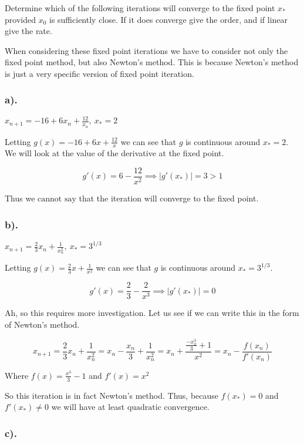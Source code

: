 \documentclass[11pt]{article}
\begin{document}
Determine which of the following iterations will converge to the fixed
point \(x_*\) provided \(x_0\) is sufficiently close. If it does
converge give the order, and if linear give the rate.

When considering these fixed point iterations we have to consider not
only the fixed point method, but also Newton's method. This is because
Newton's method is just a very specific version of fixed point
iteration.

    \hypertarget{a.}{%
\subsubsection*{a).}\label{a.}}

\(x_{n+1} = -16 + 6x_n + \frac{12}{x_n},\:x_*=2\)

    Letting \(g(x) = -16+6x+\frac{12}{x}\) we can see that \(g\) is
continuous around \(x_*=2\). We will look at the value of the derivative
at the fixed point.

\[ g'(x) = 6 - \frac{12}{x^2} \implies |g'(x_*)| = 3 > 1 \]

    Thus we \(\boxed{\text{cannot say}}\) that the iteration will converge
to the fixed point.

    \hypertarget{b.}{%
\subsubsection*{b).}\label{b.}}

\(x_{n+1} = \frac{2}{3}x_n + \frac{1}{x_n^2},\:x_*=3^{1/3}\)

    Letting \(g(x) = \frac{2}{3}x+\frac{1}{x^2}\) we can see that \(g\) is
continuous around \(x_*=3^{1/3}\).

\[ g'(x) = \frac{2}{3} - \frac{2}{x^3} \implies |g'(x_*)| = 0 \]

Ah, so this requires more investigation. Let us see if we can write this
in the form of Newton's method.

\[ x_{n+1} = \frac{2}{3}x_n + \frac{1}{x_n^2} = x_n - \frac{x_n}{3} + \frac{1}{x_n^2} = x_n + \frac{\frac{-x_n^3}{3}+1}{x^2} = x_n - \frac{f(x_n)}{f'(x_n)} \]

Where \(f(x) = \frac{x^3}{3}-1\) and \(f'(x) = x^2\)

    So this iteration is in fact Newton's method. Thus, because \(f(x_*)=0\)
and \(f'(x_*)\neq0\) we will have at least
\(\boxed{\text{quadratic convergence}}\).
\newpage
    \hypertarget{c.}{%
\subsubsection*{c).}\label{c.}}
\end{document}
